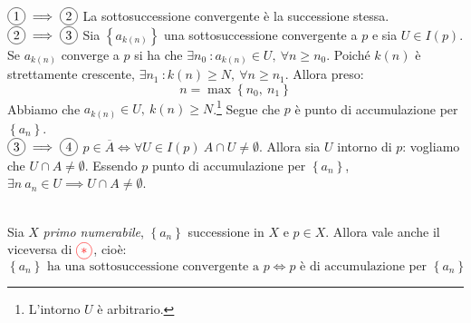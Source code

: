 \begin{demonstration}~{}\\
$\circled{1}\implies\circled{2}$ La sottosuccessione convergente è la successione stessa.\\
$\circled{2}\implies\circled{3}$ Sia $\left\{a_{k\left(n\right)}\right\}$ una sottosuccessione convergente a $p$ e sia $U\in I\left(p\right)$. \\
Se $a_{k\left(n\right)}$ converge a $p$ si ha che $\exists n_0\ \colon a_{k\left(n\right)}\in U,\ \forall n\geq n_0$. Poiché $k\left(n\right)$ è strettamente crescente, $\exists n_1\ \colon k\left(n\right)\geq N,\ \forall n\geq n_1$. Allora preso:
\begin{equation*}
	n=\max\left\{n_0,\ n_1\right\}
\end{equation*}
Abbiamo che $a_{k\left(n\right)}\in U,\ k\left(n\right)\geq N$.\footnote{L'intorno $U$ è arbitrario.} Segue che $p$ è punto di accumulazione per $\left\{a_n\right\}$.\\
$\circled{3}\implies\circled{4}$ $p\in \overline{A}\iff \forall U\in I\left(p\right)\ A\cap U\neq \emptyset$. Allora sia $U$ intorno di $p$: vogliamo che $U\cap A\neq \emptyset$. Essendo $p$ punto di accumulazione per $\left\{a_n\right\}$, $\exists n\ a_n\in U\implies U\cap A\neq \emptyset$.
\end{demonstration}
\begin{lemming}~{}\label{primonumesucc}\\
Sia $X$ \textit{primo numerabile}, $\left\{a_n\right\}$ successione in $X$ e $p\in X$. Allora vale anche il viceversa di $\textcolor{red}{\circled{\ast}}$, cioè:
\begin{equation}
	\left\{a_n\right\}\text{ ha una sottosuccessione convergente a }p\iff p\text{ è di accumulazione per }\left\{a_n\right\}
\end{equation}
\end{lemming}
